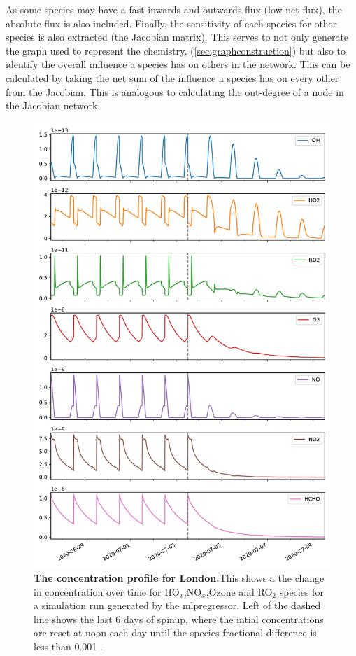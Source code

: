 As some species may have a fast inwards and outwards flux (low net-flux), the absolute flux is also included. Finally, the sensitivity of each species for other species is also extracted (the Jacobian matrix). This serves to not only generate the graph used to represent the chemistry, (\autoref{sec:graphconstruction}) but also to identify the overall influence a species has on others in the network. This can be calculated by taking the net sum of the influence a species has on every other from the Jacobian. This is analogous to calculating the out-degree of a node in the Jacobian network.\\



%

%
%
%



\begin{figure}[H]
    \centering
\includegraphics[width=.9\textwidth]{figures_c3/mlpregressor/conc_clfo.pdf}
\caption{\textbf{The concentration profile for London.}This shows a the change in concentration over time for HO$_x$,NO$_x$,Ozone and RO$_2$ species for a simulation run generated by the mlpregressor. Left of the dashed line shows the last 6 days of spinup, where the intial concentrations are reset at noon each day until the species fractional difference is less than 0.001 .}
\label{fig:clondon}
\end{figure}

